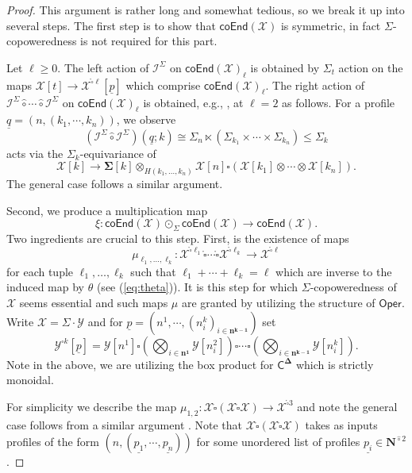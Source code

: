 \documentclass[11pt]{amsart}
\theoremstyle{definition}
\theoremstyle{remark}
\newcommand{\Oper}{\mathsf{Oper}}
\newcommand{\Cal}[1]{\mathcal{#1}}
\newcommand{\Ncirc}[1]{\mathbf{N}^{\hat{\circ}#1}}
\newcommand{\circhat}{\hat{\circ}}
\newcommand{\circdot}{{\odot}}
\newcommand{\boxcirc}{\mathring{\square}}
\newcommand{\Isym}{\Cal{I}^{\Sigma}}
\newcommand{\bdel}{\mathbf{\Delta}}
\newcommand{\coend}[1]{\mathsf{coEnd}(\Cal{#1})}
\begin{document}
\begin{proof}
    This argument is rather long and somewhat tedious, so we break it up into several steps. The first step is to show that $\mathsf{coEnd}(\Cal{X})$ is symmetric, in fact $\Sigma$-copoweredness is not required for this part. 
    
    Let $\ell\geq 0$. The left action of $\Isym$ on $\coend{X}_{\ell}$ is obtained by $\Sigma_t$ action on the maps $\Cal{X}[t]\to \Cal{X}^{\boxcirc \ell}[\underline{p}]$ which comprise $\coend{X}_{\ell}$. The right action of $\Isym\circhat \cdots \circhat \Isym$ on $\coend{X}_{\ell}$ is obtained, e.g., , at $\ell=2$ as follows. For a profile $\underline{q}=(n,(k_1,\cdots,k_n))$, we observe \[(\Isym\circhat \Isym)(\underline{q};k)\cong \Sigma_n\ltimes (\Sigma_{k_1} \times \cdots \times \Sigma_{k_n}) \leq \Sigma_k\] acts via the $\Sigma_k$-equivariance of \[ 
        \Cal{X}[k] \to \mathbf{\Sigma}[k]\otimes_{H(k_1,\dots,k_n)} \Cal{X}[n] \square (\Cal{X}[k_1] \otimes\cdots \otimes \Cal{X}[k_n]).
    \] 
    The general case follows a similar argument. 
    
    Second, we produce a multiplication map \[\xi\colon \coend{X}\circdot_{\Sigma} \coend{X}\to \coend{X}.\] Two ingredients are crucial to this step. First, is the existence of maps \begin{equation} \mu_{\ell_1,\dots,\ell_k} \colon \Cal{X}^{\boxcirc \ell_1} \boxcirc \cdots \boxcirc \Cal{X}^{\boxcirc \ell_k} \to \Cal{X}^{\boxcirc \ell}\end{equation} 
    for each tuple $\ell_1,\dots,\ell_k$ such that $\ell_1+\cdots + \ell_k=\ell$ which are inverse to the induced map by $\theta$ (see (\ref{eq:theta})). It is this step for which $\Sigma$-copoweredness of $\Cal{X}$ seems essential and such maps $\mu$ are granted by utilizing the structure of $\Oper$. Write $\Cal{X}=\Sigma {\cdot} \Cal{Y}$ and for $\underline{p}=(n^1, \cdots, (n^k_i)_{i\in \mathbf{n^{k-1}}})$ set \[ \Cal{Y}^{\square k}[\underline{p}]=\Cal{Y}[n^1] \square \left(\bigotimes_{i\in \mathbf{n^1}} \Cal{Y}[n^2_i] \right) \square \cdots \square \left( \bigotimes_{i\in \mathbf{n^{k-1}}} \Cal{Y}[n^k_i] \right).\]
    Note in the above, we are utilizing the box product for $\mathsf{C}^{\bdel}$ which is strictly monoidal. 
    
    For simplicity we describe the map $\mu_{1,2}\colon \Cal{X} \boxcirc (\Cal{X} \boxcirc \Cal{X})\to \Cal{X}^{\boxcirc 3}$ and note the general case follows from a similar argument . Note that $\Cal{X} \boxcirc (\Cal{X} \boxcirc \Cal{X})$ takes as inputs profiles of the form $(n,(\underline{p_1},\cdots, \underline{p_n}))$ for some unordered list of profiles $\underline{p_i}\in \Ncirc{2}$. 
    

\end{proof}
\end{document}
